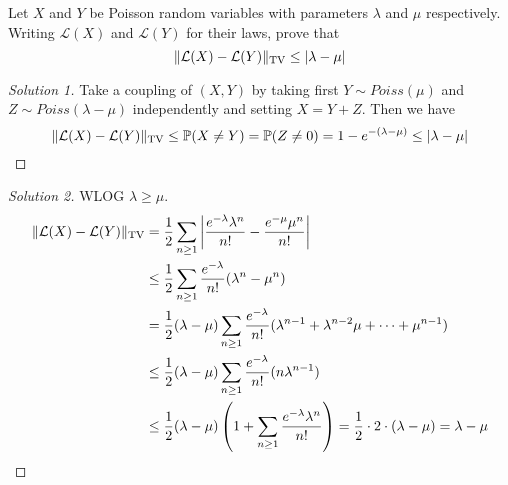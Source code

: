 \documentclass[a4paper]{article}
\renewcommand{\P}{\mathbb P}
\newcommand{\tv}{\text{TV}}
\begin{document}
\begin{question}
  Let $X$ and $Y$ be Poisson random variables with parameters $\lambda$ and
  $\mu$ respectively. Writing $\mathcal{L}(X)$ and $\mathcal{L}(Y)$ for their
  laws, prove that
  \[\norm{\mathcal{L}(X) - \mathcal{L}(Y)}_\tv \leq |\lambda - \mu|\]
\end{question}
\begin{proof}[Solution 1]
  Take a coupling of $(X,Y)$ by taking first $Y \sim Poiss(\mu)$ and $Z \sim
  Poiss(\lambda - \mu)$ independently and setting $X = Y + Z$. Then we have
  \[\norm{\mathcal{L}(X) - \mathcal{L}(Y)}_\tv \leq \P(X \neq Y) = \P(Z \neq 0) =
    1 - e^{-(\lambda - \mu)} \leq |\lambda - \mu|\]
\end{proof}
\begin{proof}[Solution 2]
  WLOG $\lambda \geq \mu$.\\
  \begin{align*}
    \norm{\mathcal{L}(X) - \mathcal{L}(Y)}_\tv &= \frac{1}{2} \sum_{n \geq 1} \left| \frac{e^{-\lambda}\lambda^n}{n!} - \frac{e^{-\mu}\mu^n}{n!} \right|\\
                                               &\leq \frac{1}{2} \sum_{n \geq 1} \frac{e^{-\lambda}}{n!}(\lambda^n - \mu^n)\\
                                               &= \frac{1}{2} ( \lambda - \mu ) \sum_{n \geq 1}\frac{e^{-\lambda}}{n!}(\lambda^{n-1} + \lambda^{n-2}\mu + \dots + \mu^{n-1})\\
                                               &\leq \frac{1}{2} ( \lambda - \mu ) \sum_{n \geq 1}\frac{e^{-\lambda}}{n!}(n\lambda^{n-1})\\
                                               &\leq \frac{1}{2}(\lambda - \mu)\left(1 + \sum_{n \geq 1}\frac{e^{-\lambda} \lambda^n}{n!}\right) = \frac{1}{2} \cdot 2 \cdot (\lambda - \mu) = \lambda - \mu
  \end{align*}
\end{proof}  
\end{document}
